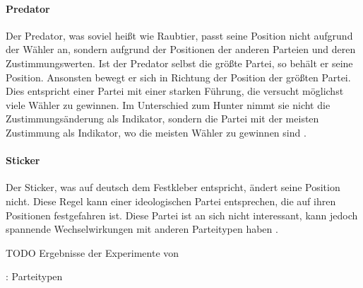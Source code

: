 \paragraph{Predator} Der Predator, was soviel heißt wie Raubtier, passt seine Position nicht aufgrund der Wähler an, sondern aufgrund der Positionen der anderen Parteien und deren Zustimmungswerten. Ist der Predator selbst die größte Partei, so behält er seine Position. Ansonsten bewegt er sich in Richtung der Position der größten Partei. Dies entspricht einer Partei mit einer starken Führung, die versucht möglichst viele Wähler zu gewinnen. Im Unterschied zum Hunter nimmt sie nicht die Zustimmungsänderung als Indikator, sondern die Partei mit der meisten Zustimmung als Indikator, wo die meisten Wähler zu gewinnen sind \citep[S.\,267]{laver2005policy}.

\paragraph{Sticker} Der Sticker, was auf deutsch dem Festkleber entspricht, ändert seine Position nicht. Diese Regel kann einer ideologischen Partei entsprechen, die auf ihren Positionen festgefahren ist. Diese Partei ist an sich nicht interessant, kann jedoch spannende Wechselwirkungen mit anderen Parteitypen haben \citep[S.\,267]{laver2005policy}.

TODO Ergebnisse der Experimente von \citep{laver2005policy}

\citet{laver2007endogenousParties}: Parteitypen %

